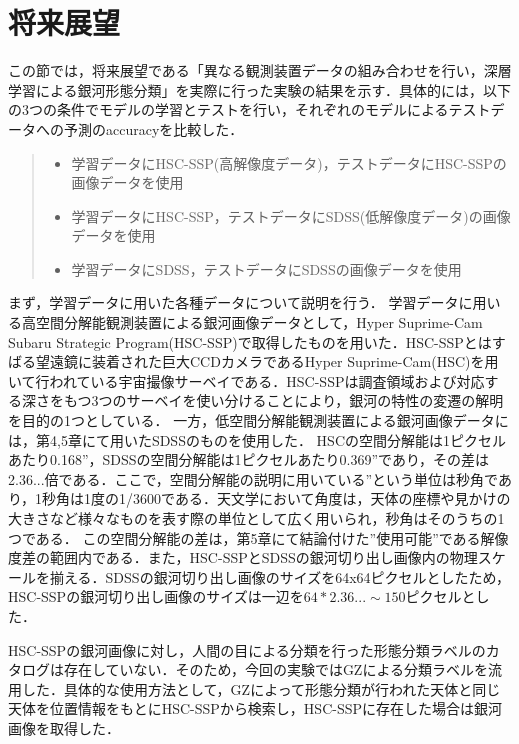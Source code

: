 \documentclass[a4j, 11pt]{jreport}
\begin{document}
\section{将来展望}
この節では，将来展望である「異なる観測装置データの組み合わせを行い，深層学習による銀河形態分類」を実際に行った実験の結果を示す．具体的には，以下の3つの条件でモデルの学習とテストを行い，それぞれのモデルによるテストデータへの予測のaccuracyを比較した．

\begin{quote}
 \begin{itemize}
  \item 学習データにHSC-SSP(高解像度データ)，テストデータにHSC-SSPの画像データを使用
  \item 学習データにHSC-SSP，テストデータにSDSS(低解像度データ)の画像データを使用
  \item 学習データにSDSS，テストデータにSDSSの画像データを使用
 \end{itemize}
\end{quote}

まず，学習データに用いた各種データについて説明を行う．
学習データに用いる高空間分解能観測装置による銀河画像データとして，Hyper Suprime-Cam Subaru Strategic Program(HSC-SSP)\cite{Tampo2020}で取得したものを用いた．HSC-SSPとはすばる望遠鏡に装着された巨大CCDカメラであるHyper Suprime-Cam(HSC)を用いて行われている宇宙撮像サーベイである．HSC-SSPは調査領域および対応する深さをもつ3つのサーベイを使い分けることにより，銀河の特性の変遷の解明を目的の1つとしている．
一方，低空間分解能観測装置による銀河画像データには，第4,5章にて用いたSDSSのものを使用した．
HSCの空間分解能は1ピクセルあたり0.168''，SDSSの空間分解能は1ピクセルあたり0.369''であり，その差は2.36...倍である．ここで，空間分解能の説明に用いている''という単位は秒角であり，1秒角は1度の1/3600である．天文学において角度は，天体の座標や見かけの大きさなど様々なものを表す際の単位として広く用いられ，秒角はそのうちの1つである．
この空間分解能の差は，第5章にて結論付けた''使用可能''である解像度差の範囲内である．また，HSC-SSPとSDSSの銀河切り出し画像内の物理スケールを揃える．SDSSの銀河切り出し画像のサイズを64x64ピクセルとしたため，HSC-SSPの銀河切り出し画像のサイズは一辺を$64 * 2.36... \sim 150$ピクセルとした．

HSC-SSPの銀河画像に対し，人間の目による分類を行った形態分類ラベルのカタログは存在していない．そのため，今回の実験ではGZによる分類ラベルを流用した．具体的な使用方法として，GZによって形態分類が行われた天体と同じ天体を位置情報をもとにHSC-SSPから検索し，HSC-SSPに存在した場合は銀河画像を取得した．
\end{document}

